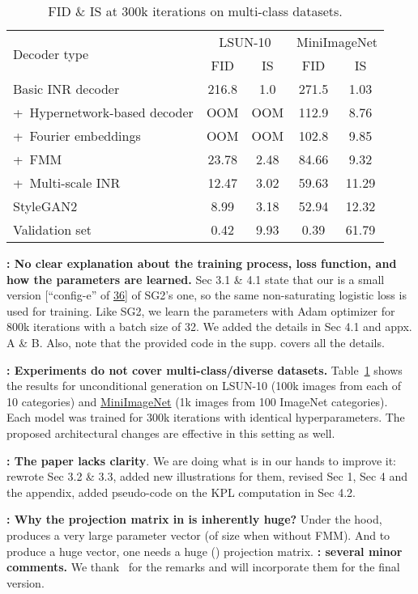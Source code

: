 \documentclass[rebuttal]{cvpr}
\newcommand{\ReviewerB}{\textcolor{magenta}{}}
\newcommand{\ReviewerC}{\textcolor{violet}{}}
\newcommand{\ReviewerBsays}[1]{\textbf{\ReviewerB: \textbf{#1}}}
\newcommand{\ReviewerCsays}[1]{\textbf{\ReviewerC: \textbf{#1}}}
\begin{document}
\begin{table}
\caption{FID \& IS at 300k iterations on multi-class datasets.}
\label{table:diverse-datasets}
\centering
\begin{tabular}{|l|cc|cc|}
\hline
\multirow{2}{*}{Decoder type} & \multicolumn{2}{c|}{LSUN-10} & \multicolumn{2}{c|}{MiniImageNet} \\
& FID  & IS  & FID  & IS  \\
\hline
Basic INR decoder & 216.8 & 1.0 & 271.5 & 1.03 \\
+~Hypernetwork-based decoder & OOM & OOM & 112.9 & 8.76 \\
+~Fourier embeddings & OOM & OOM & 102.8 & 9.85 \\
+~FMM & 23.78 & 2.48 & 84.66 & 9.32 \\
+~Multi-scale INR & 12.47 & 3.02 & 59.63 & 11.29 \\
\hline
StyleGAN2 & 8.99 & 3.18 & 52.94 & 12.32 \\
\hline
Validation set & 0.42 & 9.93 & 0.39 & 61.79 \\
\hline
\end{tabular}
\end{table}
 
\ReviewerBsays{No clear explanation about the training process, loss function, and how the parameters are learned.} Sec 3.1 \& 4.1 state that our  is a small version [``config-e'' of \href{https://arxiv.org/abs/1912.04958}{36}] of SG2's one, so the same non-saturating logistic loss is used for training.
Like SG2, we learn the parameters with Adam optimizer for 800k iterations with a batch size of 32.
We added the details in Sec 4.1 and appx. A \& B.
Also, note that the provided code in the supp. covers all the details.


\ReviewerBsays{Experiments do not cover multi-class/diverse datasets.}
Table~\ref{table:diverse-datasets} shows the results for unconditional generation on LSUN-10  (100k images from each of 10 categories) and \href{https://github.com/yaoyao-liu/mini-imagenet-tools}{MiniImageNet}  (1k images from 100 ImageNet categories).
Each model was trained for 300k iterations with identical hyperparameters.
The proposed architectural changes are effective in this setting as well.

\ReviewerBsays{The paper lacks clarity}.
We are doing what is in our hands to improve it: rewrote Sec 3.2 \& 3.3, added new illustrations for them, revised Sec 1, Sec 4 and the appendix, added pseudo-code on the KPL computation in Sec 4.2.

\ReviewerCsays{Why the projection matrix in  is inherently huge?}
Under the hood,  produces a very large parameter vector  (of size  when without FMM).
And to produce a huge vector, one needs a huge () projection matrix. \ReviewerCsays{several minor comments.} We thank \ReviewerC\ for the remarks and will incorporate them for the final version.
\end{document}
